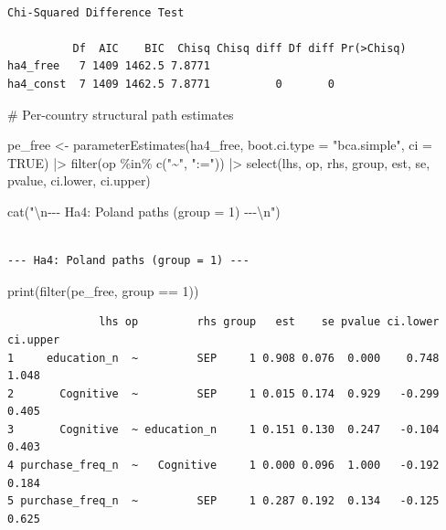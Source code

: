 \documentclass[
  letterpaper,
  DIV=11,
  numbers=noendperiod]{scrartcl}
\newenvironment{Shaded}{\begin{snugshade}}{\end{snugshade}}
\newcommand{\AttributeTok}[1]{\textcolor[rgb]{0.40,0.45,0.13}{#1}}
\newcommand{\CommentTok}[1]{\textcolor[rgb]{0.37,0.37,0.37}{#1}}
\newcommand{\ConstantTok}[1]{\textcolor[rgb]{0.56,0.35,0.01}{#1}}
\newcommand{\DecValTok}[1]{\textcolor[rgb]{0.68,0.00,0.00}{#1}}
\newcommand{\FunctionTok}[1]{\textcolor[rgb]{0.28,0.35,0.67}{#1}}
\newcommand{\NormalTok}[1]{\textcolor[rgb]{0.00,0.23,0.31}{#1}}
\newcommand{\OtherTok}[1]{\textcolor[rgb]{0.00,0.23,0.31}{#1}}
\newcommand{\SpecialCharTok}[1]{\textcolor[rgb]{0.37,0.37,0.37}{#1}}
\newcommand{\StringTok}[1]{\textcolor[rgb]{0.13,0.47,0.30}{#1}}
\begin{document}
\begin{verbatim}

Chi-Squared Difference Test

          Df  AIC    BIC  Chisq Chisq diff Df diff Pr(>Chisq)
ha4_free   7 1409 1462.5 7.8771                              
ha4_const  7 1409 1462.5 7.8771          0       0           
\end{verbatim}

\begin{Shaded}
\begin{Highlighting}[]
\CommentTok{\# Per{-}country structural path estimates}

\NormalTok{pe\_free }\OtherTok{\textless{}{-}} \FunctionTok{parameterEstimates}\NormalTok{(ha4\_free, }\AttributeTok{boot.ci.type =} \StringTok{"bca.simple"}\NormalTok{, }\AttributeTok{ci =} \ConstantTok{TRUE}\NormalTok{) }\SpecialCharTok{|\textgreater{}}
  \FunctionTok{filter}\NormalTok{(op }\SpecialCharTok{\%in\%} \FunctionTok{c}\NormalTok{(}\StringTok{"\textasciitilde{}"}\NormalTok{, }\StringTok{":="}\NormalTok{)) }\SpecialCharTok{|\textgreater{}}
  \FunctionTok{select}\NormalTok{(lhs, op, rhs, group, est, se, pvalue, ci.lower, ci.upper)}

\FunctionTok{cat}\NormalTok{(}\StringTok{"}\SpecialCharTok{\textbackslash{}n}\StringTok{{-}{-}{-} Ha4: Poland paths (group = 1) {-}{-}{-}}\SpecialCharTok{\textbackslash{}n}\StringTok{"}\NormalTok{)}
\end{Highlighting}
\end{Shaded}

\begin{verbatim}

--- Ha4: Poland paths (group = 1) ---
\end{verbatim}

\begin{Shaded}
\begin{Highlighting}[]
\FunctionTok{print}\NormalTok{(}\FunctionTok{filter}\NormalTok{(pe\_free, group }\SpecialCharTok{==} \DecValTok{1}\NormalTok{))}
\end{Highlighting}
\end{Shaded}

\begin{verbatim}
              lhs op         rhs group   est    se pvalue ci.lower ci.upper
1     education_n  ~         SEP     1 0.908 0.076  0.000    0.748    1.048
2       Cognitive  ~         SEP     1 0.015 0.174  0.929   -0.299    0.405
3       Cognitive  ~ education_n     1 0.151 0.130  0.247   -0.104    0.403
4 purchase_freq_n  ~   Cognitive     1 0.000 0.096  1.000   -0.192    0.184
5 purchase_freq_n  ~         SEP     1 0.287 0.192  0.134   -0.125    0.625
\end{verbatim}
\end{document}
